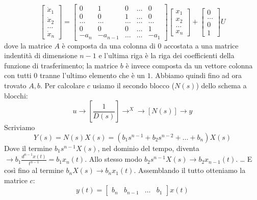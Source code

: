 \[
    \left[\begin{matrix}
        \dot{x}_1\\
        \dot{x}_2\\
        \dots\\
        \dot{x}_n
    \end{matrix}\right] = \left[\begin{matrix}
        0 & 1 & 0 & \dots & 0 \\
        0 & 0 & 1 & \dots & 0 \\
        \dots & \dots &\dots&\dots&\dots\\
        0 & 0 & 0 & \dots & 1\\
        -a_n & -a_{n-1} & \dots & \dots & -a_1
    \end{matrix}\right] \left[\begin{matrix}
        x_1\\x_2\\\dots\\x_n
    \end{matrix}\right] + \left[\begin{matrix}
        0\\\dots\\0\\1
    \end{matrix}\right] U
\]
dove la matrice $A$ è composta da una colonna di $0$ accostata a una matrice indentità di dimensione $n-1$ e l'ultima riga è la riga dei coefficienti della funzione di trasferimento; la matrice $b$ è invece composta da un vettore colonna con tutti $0$ tranne l'ultimo elemento che è un $1$.\newline
\newline
Abbiamo quindi fino ad ora trovato $A,b$. Per calcolare $c$ usiamo il secondo blocco ($N(s)$) dello schema a blocchi:
\[
    u \rightarrow \left[\frac{1}{D(s)}\right] \rightarrow^X \rightarrow  \left[N(s)\right] \rightarrow  y
\]
Scriviamo
\[
    Y(s) = N(s) X(s) = (b_1 s^{n-1} + b_2 s^{n-2} + \dots + b_n) X(s)
\]
Dove il termine $b_1 s^{n-1} X(s)$, nel dominio del tempo, diventa $\rightarrow  b_1 \frac{d^{n-1}x(t)}{t^{n-1}} = b_1 x_n(t)$.\newline
Allo stesso modo $b_2 s^{n-1}X(s) \rightarrow b_2 x_{n-1}(t)$.\newline
\dots \newline
E così fino al termine $b_n X(s) \rightarrow  b_n x_1(t)$.\newline
Assemblando il tutto otteniamo la matrice $c$:
\[
    y(t) = \left[\begin{matrix}
        b_n & b_{n-1} & \dots & b_1
    \end{matrix}\right] x(t)
\]
\ \newline
\newline
